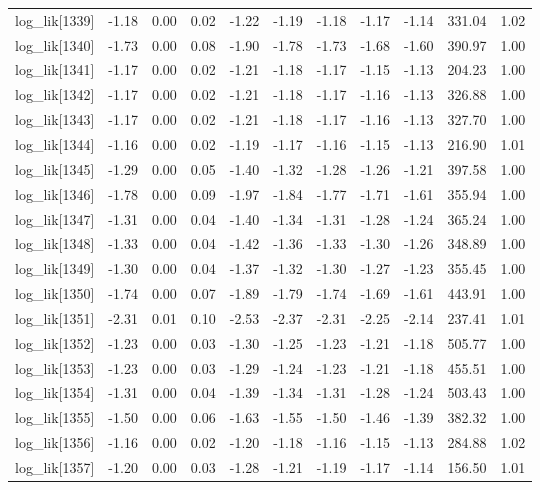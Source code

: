 \begin{table}[ht]
\begin{tabular}{rrrrrrrrrrr}
  log\_lik[1339] & -1.18 & 0.00 & 0.02 & -1.22 & -1.19 & -1.18 & -1.17 & -1.14 & 331.04 & 1.02 \\ 
  log\_lik[1340] & -1.73 & 0.00 & 0.08 & -1.90 & -1.78 & -1.73 & -1.68 & -1.60 & 390.97 & 1.00 \\ 
  log\_lik[1341] & -1.17 & 0.00 & 0.02 & -1.21 & -1.18 & -1.17 & -1.15 & -1.13 & 204.23 & 1.00 \\ 
  log\_lik[1342] & -1.17 & 0.00 & 0.02 & -1.21 & -1.18 & -1.17 & -1.16 & -1.13 & 326.88 & 1.00 \\ 
  log\_lik[1343] & -1.17 & 0.00 & 0.02 & -1.21 & -1.18 & -1.17 & -1.16 & -1.13 & 327.70 & 1.00 \\ 
  log\_lik[1344] & -1.16 & 0.00 & 0.02 & -1.19 & -1.17 & -1.16 & -1.15 & -1.13 & 216.90 & 1.01 \\ 
  log\_lik[1345] & -1.29 & 0.00 & 0.05 & -1.40 & -1.32 & -1.28 & -1.26 & -1.21 & 397.58 & 1.00 \\ 
  log\_lik[1346] & -1.78 & 0.00 & 0.09 & -1.97 & -1.84 & -1.77 & -1.71 & -1.61 & 355.94 & 1.00 \\ 
  log\_lik[1347] & -1.31 & 0.00 & 0.04 & -1.40 & -1.34 & -1.31 & -1.28 & -1.24 & 365.24 & 1.00 \\ 
  log\_lik[1348] & -1.33 & 0.00 & 0.04 & -1.42 & -1.36 & -1.33 & -1.30 & -1.26 & 348.89 & 1.00 \\ 
  log\_lik[1349] & -1.30 & 0.00 & 0.04 & -1.37 & -1.32 & -1.30 & -1.27 & -1.23 & 355.45 & 1.00 \\ 
  log\_lik[1350] & -1.74 & 0.00 & 0.07 & -1.89 & -1.79 & -1.74 & -1.69 & -1.61 & 443.91 & 1.00 \\ 
  log\_lik[1351] & -2.31 & 0.01 & 0.10 & -2.53 & -2.37 & -2.31 & -2.25 & -2.14 & 237.41 & 1.01 \\ 
  log\_lik[1352] & -1.23 & 0.00 & 0.03 & -1.30 & -1.25 & -1.23 & -1.21 & -1.18 & 505.77 & 1.00 \\ 
  log\_lik[1353] & -1.23 & 0.00 & 0.03 & -1.29 & -1.24 & -1.23 & -1.21 & -1.18 & 455.51 & 1.00 \\ 
  log\_lik[1354] & -1.31 & 0.00 & 0.04 & -1.39 & -1.34 & -1.31 & -1.28 & -1.24 & 503.43 & 1.00 \\ 
  log\_lik[1355] & -1.50 & 0.00 & 0.06 & -1.63 & -1.55 & -1.50 & -1.46 & -1.39 & 382.32 & 1.00 \\ 
  log\_lik[1356] & -1.16 & 0.00 & 0.02 & -1.20 & -1.18 & -1.16 & -1.15 & -1.13 & 284.88 & 1.02 \\ 
  log\_lik[1357] & -1.20 & 0.00 & 0.03 & -1.28 & -1.21 & -1.19 & -1.17 & -1.14 & 156.50 & 1.01 \\ 

\end{tabular}
\end{table}
